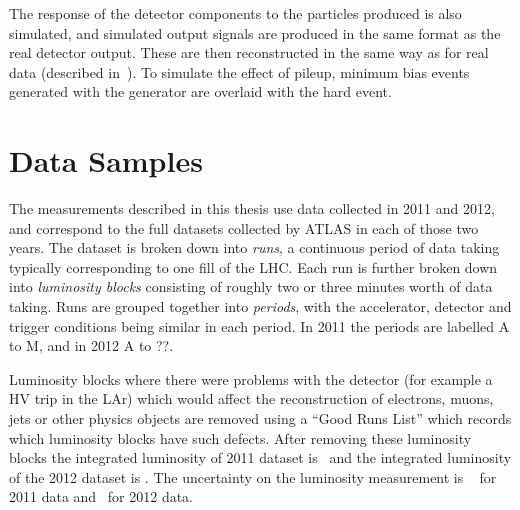 The response of the detector components to the particles produced is also
simulated, and simulated output signals are produced in the same format as the
real
detector output. These are then reconstructed in the same way as
for real data (described in~). To simulate the effect of pileup, minimum bias events generated with the \pythia
generator are overlaid with the hard event.

\section{Data Samples}

The measurements described in this thesis use data collected in 2011 and 2012,
and correspond to the full datasets collected by ATLAS in each of those two
years. The dataset is broken down into {\it runs}, a continuous period of data
taking typically corresponding to one fill of the LHC. Each run is further
broken down into {\it luminosity blocks} consisting of roughly two or three
minutes worth of data taking. Runs are grouped together into {\it periods}, with
the accelerator, detector and trigger conditions being similar in each period.
In 2011 the periods are labelled A to M, and in 2012 A to ??.

Luminosity blocks where there were problems with the detector (for example a HV
trip in the LAr) which would affect the reconstruction of electrons, muons, jets
or other physics objects are removed using a ``Good Runs List'' which records
which luminosity blocks have such defects. After removing these luminosity blocks
the integrated luminosity of 2011 dataset is \LumiPassGRLTwentyEleven\ and the integrated luminosity
of the 2012 dataset is \LumiPassGRLTwentyTwelve. The uncertainty on the
luminosity measurement is \LumiUncTwentyEleven~\cite{ATLAS-CONF-2011-116,Aad:2011dr} for 2011 data and
\LumiUncTwentyTwelve\ for 2012 data.

